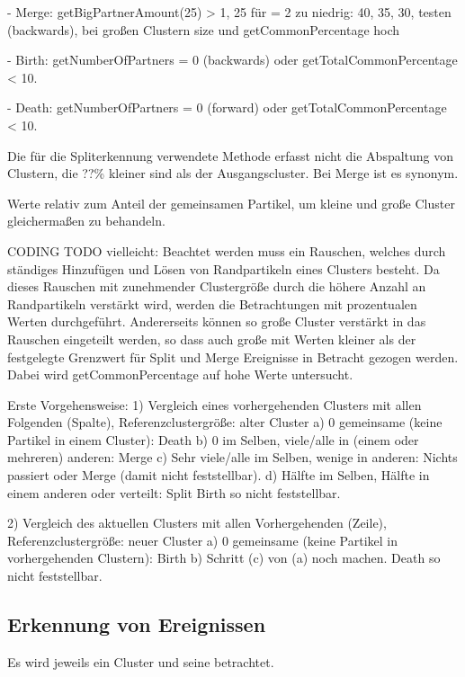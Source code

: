 - Merge: getBigPartnerAmount(25) > 1, 25 für = 2 zu niedrig: 40, 35, 30, testen (backwards), bei großen Clustern size und getCommonPercentage hoch

- Birth: getNumberOfPartners = 0 (backwards) oder getTotalCommonPercentage < 10.

- Death: getNumberOfPartners = 0 (forward) oder getTotalCommonPercentage < 10.

Die für die Spliterkennung verwendete Methode erfasst nicht die Abspaltung von Clustern, die ??\% kleiner sind als der Ausgangscluster. Bei Merge ist es synonym.

Werte relativ zum Anteil der gemeinsamen Partikel, um kleine und große Cluster gleichermaßen zu behandeln.

CODING TODO vielleicht:
Beachtet werden muss ein Rauschen, welches durch ständiges Hinzufügen und Lösen von Randpartikeln eines Clusters besteht. Da dieses Rauschen mit zunehmender Clustergröße durch die höhere Anzahl an Randpartikeln verstärkt wird, werden die Betrachtungen mit prozentualen Werten durchgeführt. Andererseits können so große Cluster verstärkt in das Rauschen eingeteilt werden, so dass auch große  mit Werten kleiner als der festgelegte Grenzwert für Split und Merge Ereignisse in Betracht gezogen werden. Dabei wird getCommonPercentage auf hohe Werte untersucht.



Erste Vorgehensweise:
1) Vergleich eines vorhergehenden Clusters mit allen Folgenden (Spalte), Referenzclustergröße: alter Cluster
a) 0 gemeinsame (keine Partikel in einem Cluster): Death
b) 0 im Selben, viele/alle in (einem oder mehreren) anderen: Merge
c) Sehr viele/alle im Selben, wenige in anderen: Nichts passiert oder Merge (damit nicht feststellbar).
d) Hälfte im Selben, Hälfte in einem anderen oder verteilt: Split
Birth so nicht feststellbar.

2) Vergleich des aktuellen Clusters mit allen Vorhergehenden (Zeile), Referenzclustergröße: neuer Cluster
a) 0 gemeinsame (keine Partikel in vorhergehenden Clustern): Birth
b) Schritt (c) von (a) noch machen.
Death so nicht feststellbar.

\subsection{Erkennung von Ereignissen}

Es wird jeweils ein Cluster und seine  betrachtet.


